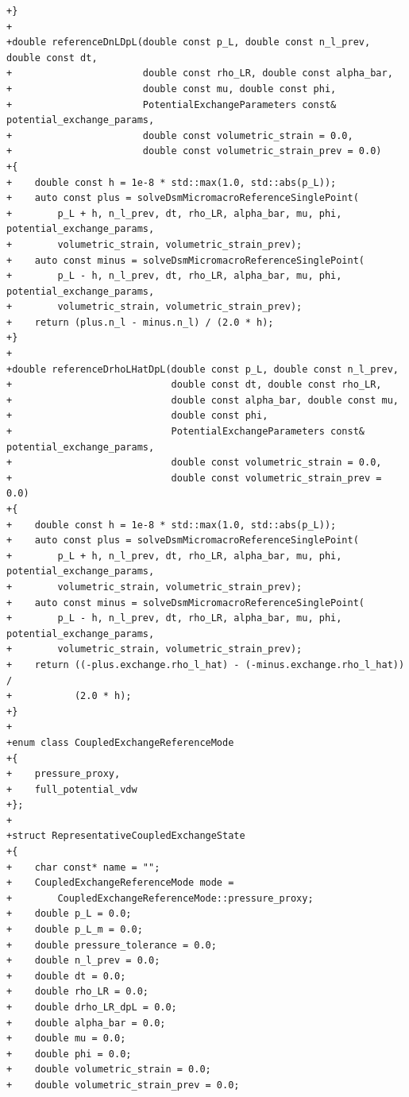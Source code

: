 \documentclass[10pt]{article}
\begin{document}
\begin{lstlisting}
+}
+
+double referenceDnLDpL(double const p_L, double const n_l_prev, double const dt,
+                       double const rho_LR, double const alpha_bar,
+                       double const mu, double const phi,
+                       PotentialExchangeParameters const& potential_exchange_params,
+                       double const volumetric_strain = 0.0,
+                       double const volumetric_strain_prev = 0.0)
+{
+    double const h = 1e-8 * std::max(1.0, std::abs(p_L));
+    auto const plus = solveDsmMicromacroReferenceSinglePoint(
+        p_L + h, n_l_prev, dt, rho_LR, alpha_bar, mu, phi, potential_exchange_params,
+        volumetric_strain, volumetric_strain_prev);
+    auto const minus = solveDsmMicromacroReferenceSinglePoint(
+        p_L - h, n_l_prev, dt, rho_LR, alpha_bar, mu, phi, potential_exchange_params,
+        volumetric_strain, volumetric_strain_prev);
+    return (plus.n_l - minus.n_l) / (2.0 * h);
+}
+
+double referenceDrhoLHatDpL(double const p_L, double const n_l_prev,
+                            double const dt, double const rho_LR,
+                            double const alpha_bar, double const mu,
+                            double const phi,
+                            PotentialExchangeParameters const& potential_exchange_params,
+                            double const volumetric_strain = 0.0,
+                            double const volumetric_strain_prev = 0.0)
+{
+    double const h = 1e-8 * std::max(1.0, std::abs(p_L));
+    auto const plus = solveDsmMicromacroReferenceSinglePoint(
+        p_L + h, n_l_prev, dt, rho_LR, alpha_bar, mu, phi, potential_exchange_params,
+        volumetric_strain, volumetric_strain_prev);
+    auto const minus = solveDsmMicromacroReferenceSinglePoint(
+        p_L - h, n_l_prev, dt, rho_LR, alpha_bar, mu, phi, potential_exchange_params,
+        volumetric_strain, volumetric_strain_prev);
+    return ((-plus.exchange.rho_l_hat) - (-minus.exchange.rho_l_hat)) /
+           (2.0 * h);
+}
+
+enum class CoupledExchangeReferenceMode
+{
+    pressure_proxy,
+    full_potential_vdw
+};
+
+struct RepresentativeCoupledExchangeState
+{
+    char const* name = "";
+    CoupledExchangeReferenceMode mode =
+        CoupledExchangeReferenceMode::pressure_proxy;
+    double p_L = 0.0;
+    double p_L_m = 0.0;
+    double pressure_tolerance = 0.0;
+    double n_l_prev = 0.0;
+    double dt = 0.0;
+    double rho_LR = 0.0;
+    double drho_LR_dpL = 0.0;
+    double alpha_bar = 0.0;
+    double mu = 0.0;
+    double phi = 0.0;
+    double volumetric_strain = 0.0;
+    double volumetric_strain_prev = 0.0;

\end{lstlisting}
\end{document}
